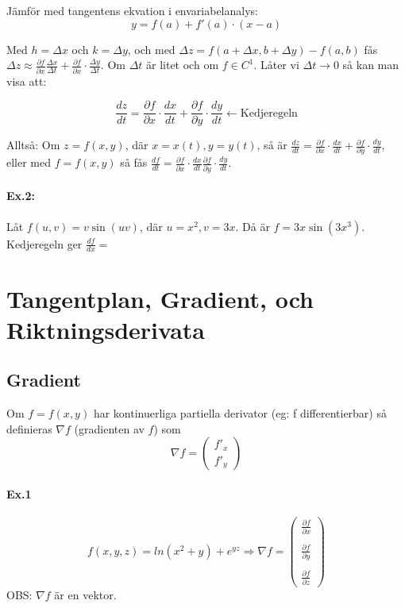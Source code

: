 \documentclass[a4paper,12pt]{article}
\newcommand{\partialfrac}[2]{\frac{\partial #1}{\partial #2}}
\begin{document}
Jämför med tangentens ekvation i envariabelanalys:
\begin{equation*}
  y = f(a)+f'(a)\cdot(x-a)
\end{equation*}

Med $h = \Delta x$ och $k = \Delta y$, och med
$\Delta z = f(a+\Delta x, b+\Delta y) - f(a,b)$ fås
$\Delta z \approx \partialfrac{f}{x}\frac{\Delta x}{\Delta t}
+ \partialfrac{f}{x} \cdot \frac{\Delta y}{\Delta t}$. Om $\Delta t$ är litet
och om $f \in C^1$. Låter vi $\Delta t \to 0$ så kan man visa att:

\begin{equation*}
  \frac{dz}{dt} = \partialfrac{f}{x} \cdot \frac{dx}{dt}
  + \partialfrac{f}{y} \cdot \frac{dy}{dt} \leftarrow \text{Kedjeregeln}
\end{equation*}

Alltså: Om $z = f(x,y)$, där $x=x(t), y=y(t)$, så är
$\frac{dz}{dt} = \partialfrac{f}{x} \cdot \frac{dx}{dt} +
\partialfrac{f}{y} \cdot \frac{dy}{dt}$, eller med $f=f(x,y)$ så fås
$\frac{df}{dt} = \partialfrac{f}{x} \cdot \frac{dx}{dt} 
\partialfrac{f}{y} \cdot \frac{dy}{dt}$.

\paragraph{Ex.2:} Låt $f(u,v) = v\sin(uv)$, där $u=x^2, v=3x$. Då är
$f = 3x\sin(3x^3)$. Kedjeregeln ger $\frac{df}{dx}=$

\section{Tangentplan, Gradient, och Riktningsderivata}
\subsection{Gradient}
Om $f=f(x,y)$ har kontinuerliga partiella derivator (eg: f differentierbar)
så definieras $\nabla f$ (gradienten av $f$) som
\begin{equation*}
  \nabla f = \begin{pmatrix}
               f'_x\\
               f'_y
             \end{pmatrix}
\end{equation*}

\paragraph{Ex.1}
  \begin{equation*}
    f(x,y,z) = ln(x^2+y)+e^{yz} \Rightarrow \nabla f =
    \begin{pmatrix}
      \partialfrac{f}{x}\\\\
      \partialfrac{f}{y}\\\\
      \partialfrac{f}{z}
    \end{pmatrix}
  \end{equation*}
  OBS: $\nabla f$ är en vektor.
\end{document}
